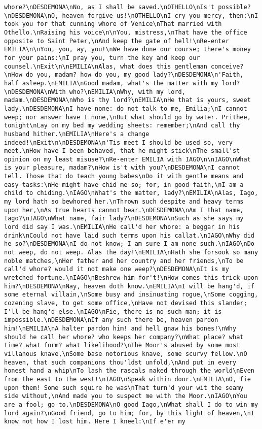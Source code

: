\begin{verbatim}
whore?\nDESDEMONA\nNo, as I shall be saved.\nOTHELLO\nIs't possible?\nDESDEMONA\nO, heaven forgive us!\nOTHELLO\nI cry you mercy, then:\nI took you for that cunning whore of Venice\nThat married with Othello.\nRaising his voice\n\nYou, mistress,\nThat have the office opposite to Saint Peter,\nAnd keep the gate of hell!\nRe-enter EMILIA\n\nYou, you, ay, you!\nWe have done our course; there's money for your pains:\nI pray you, turn the key and keep our counsel.\nExit\n\nEMILIA\nAlas, what does this gentleman conceive?\nHow do you, madam? how do you, my good lady?\nDESDEMONA\n'Faith, half asleep.\nEMILIA\nGood madam, what's the matter with my lord?\nDESDEMONA\nWith who?\nEMILIA\nWhy, with my lord, madam.\nDESDEMONA\nWho is thy lord?\nEMILIA\nHe that is yours, sweet lady.\nDESDEMONA\nI have none: do not talk to me, Emilia;\nI cannot weep; nor answer have I none,\nBut what should go by water. Prithee, tonight\nLay on my bed my wedding sheets: remember;\nAnd call thy husband hither.\nEMILIA\nHere's a change indeed!\nExit\n\nDESDEMONA\n'Tis meet I should be used so, very meet.\nHow have I been behaved, that he might stick\nThe small'st opinion on my least misuse?\nRe-enter EMILIA with IAGO\n\nIAGO\nWhat is your pleasure, madam?\nHow is't with you?\nDESDEMONA\nI cannot tell. Those that do teach young babes\nDo it with gentle means and easy tasks:\nHe might have chid me so; for, in good faith,\nI am a child to chiding.\nIAGO\nWhat's the matter, lady?\nEMILIA\nAlas, Iago, my lord hath so bewhored her.\nThrown such despite and heavy terms upon her,\nAs true hearts cannot bear.\nDESDEMONA\nAm I that name, Iago?\nIAGO\nWhat name, fair lady?\nDESDEMONA\nSuch as she says my lord did say I was.\nEMILIA\nHe call'd her whore: a beggar in his drink\nCould not have laid such terms upon his callat.\nIAGO\nWhy did he so?\nDESDEMONA\nI do not know; I am sure I am none such.\nIAGO\nDo not weep, do not weep. Alas the day!\nEMILIA\nHath she forsook so many noble matches,\nHer father and her country and her friends,\nTo be call'd whore? would it not make one weep?\nDESDEMONA\nIt is my wretched fortune.\nIAGO\nBeshrew him for't!\nHow comes this trick upon him?\nDESDEMONA\nNay, heaven doth know.\nEMILIA\nI will be hang'd, if some eternal villain,\nSome busy and insinuating rogue,\nSome cogging, cozening slave, to get some office,\nHave not devised this slander; I'll be hang'd else.\nIAGO\nFie, there is no such man; it is impossible.\nDESDEMONA\nIf any such there be, heaven pardon him!\nEMILIA\nA halter pardon him! and hell gnaw his bones!\nWhy should he call her whore? who keeps her company?\nWhat place? what time? what form? what likelihood?\nThe Moor's abused by some most villanous knave,\nSome base notorious knave, some scurvy fellow.\nO heaven, that such companions thou'ldst unfold,\nAnd put in every honest hand a whip\nTo lash the rascals naked through the world\nEven from the east to the west!\nIAGO\nSpeak within door.\nEMILIA\nO, fie upon them! Some such squire he was\nThat turn'd your wit the seamy side without,\nAnd made you to suspect me with the Moor.\nIAGO\nYou are a fool; go to.\nDESDEMONA\nO good Iago,\nWhat shall I do to win my lord again?\nGood friend, go to him; for, by this light of heaven,\nI know not how I lost him. Here I kneel:\nIf e'er my 
\end{verbatim}
